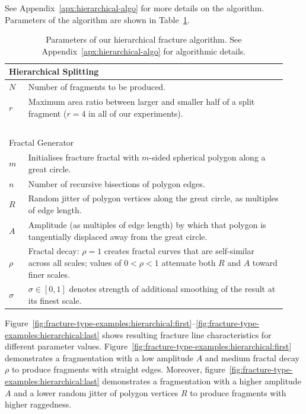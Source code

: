 \documentclass[acmlarge,screen,dvipsnames]{acmart}
\begin{document}
%
See Appendix~\ref{apx:hierarchical-algo} for
more details on the algorithm.  Parameters of the algorithm are shown in
Table~\ref{tab:hierarchical-parameters}.
%
\begin{table}
  \begin{tabular}{|l|p{0.933\linewidth}|}
    \hline
    \multicolumn{2}{|l|}{Hierarchical Splitting}\\
    \hline
    $N$ & Number of fragments to be produced.\\
    $r$ & Maximum area ratio between larger and smaller half of a split fragment ($r=4$ in all of our experiments).\\
    \hline
    \multicolumn{2}{l}{~}\\[-1.33ex]
    \hline
    \multicolumn{2}{|l|}{Fractal Generator}\\
    \hline
    $m$ & Initialises fracture fractal with $m$-sided spherical polygon along a great circle.\\
    $n$ & Number of recursive bisections of polygon edges.\\
    $R$ & Random jitter of polygon vertices along the great circle, as multiples of edge length.\\
    $A$ & Amplitude (as multiples of edge length) by which that polygon is tangentially displaced away from the great circle.\\
    $\rho$ & Fractal decay: $\rho=1$ creates fractal curves that are
    self-similar across all scales; values of $0 < \rho < 1$ attenuate both
    $R$ and $A$ toward finer scales.\\
    $\sigma$ & $\sigma\in[0,1]$ denotes strength of additional smoothing of the result at its finest scale.\\
    \hline
  \end{tabular}
  \caption{\label{tab:hierarchical-parameters}%
    Parameters of our hierarchical fracture algorithm.
    See Appendix~\ref{apx:hierarchical-algo} for algorithmic details.}
\end{table}
%
Figure~\ref{fig:fracture-type-examples:hierarchical:first}--\ref{fig:fracture-type-examples:hierarchical:last}
shows resulting fracture line characteristics for different parameter values. Figure~\ref{fig:fracture-type-examples:hierarchical:first} demonstrates a fragmentation with a low amplitude $A$ and medium fractal decay $\rho$ to produce fragments with straight edges. Moreover, figure~\ref{fig:fracture-type-examples:hierarchical:last} demonstrates a fragmentation with a higher amplitude $A$ and a lower random jitter of polygon vertices $R$ to produce fragments with higher raggedness.
\end{document}
